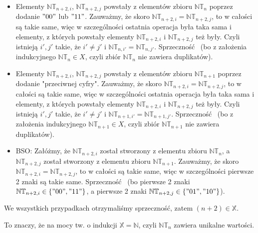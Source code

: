 \begin{itemize}
	\item Elementy $\mathbb{NT}_{n + 2, i}$, $\mathbb{NT}_{n + 2, j}$ powstały z elementów zbioru $\mathbb{NT}_n$ poprzez dodanie $"00"$ lub $"11"$. Zauważmy, że skoro $\mathbb{NT}_{n + 2, i} = \mathbb{NT}_{n + 2, j}$, to w całości są takie same, więc w szczególności ostatnia operacja była taka sama i elementy, z których powstały elementy $\mathbb{NT}_{n + 2, i}$ i $\mathbb{NT}_{n + 2, j}$ też były. Czyli istnieją $i\prime, j\prime$ takie, że $i\prime \neq j\prime$ i $\mathbb{NT}_{n, i\prime} = \mathbb{NT}_{n, j\prime}$. Sprzeczność \lightning (bo z założenia indukcyjnego $\mathbb{NT}_n \in X$, czyli zbiór $\mathbb{NT}_n$ nie zawiera duplikatów).

	\item Elementy $\mathbb{NT}_{n + 2, i}$, $\mathbb{NT}_{n + 2, j}$ powstały z elementów zbioru $\mathbb{NT}_{n + 1}$ poprzez dodanie "przeciwnej cyfry". Zauważmy, że skoro $\mathbb{NT}_{n + 2, i} = \mathbb{NT}_{n + 2, j}$, to w całości są takie same, więc w szczególności ostatnia operacja była taka sama i elementy, z których powstały elementy $\mathbb{NT}_{n + 2, i}$ i $\mathbb{NT}_{n + 2, j}$ też były. Czyli istnieją $i\prime, j\prime$ takie, że $i\prime \neq j\prime$ i $\mathbb{NT}_{n + 1, i\prime} = \mathbb{NT}_{n + 1, j\prime}$. Sprzeczność \lightning (bo z założenia indukcyjnego $\mathbb{NT}_{n + 1} \in X$, czyli zbiór $\mathbb{NT}_{n + 1}$ nie zawiera duplikatów).

	\item BSO: Załóżmy, że $\mathbb{NT}_{n + 2, i}$ został stworzony z elementu zbioru $\mathbb{NT}_n$, a $\mathbb{NT}_{n + 2, j}$ został stworzony z elementu zbioru $\mathbb{NT}_{n + 1}$. Zauważmy, że skoro $\mathbb{NT}_{n + 2, i} = \mathbb{NT}_{n + 2, j}$, to w całości są takie same, więc w szczególności pierwsze 2 znaki są takie same. Sprzeczność \lightning (bo pierwsze 2 znaki $\mathbb{NT}_{n + 2, i} \in \{"00", "11"\}$, a  pierwsze 2 znaki $\mathbb{NT}_{n + 2, j} \in \{"01", "10"\}$).
\end{itemize}

\noindent
We wszystkich przypadkach otrzymaliśmy sprzeczność, zatem $(n + 2) \in \mathbb{X}$.
\n

\noindent
To znaczy, że na mocy tw. o indukcji $\mathbb{X} = \mathbb{N}$, czyli $\mathbb{NT}_n$ zawiera unikalne wartości.
